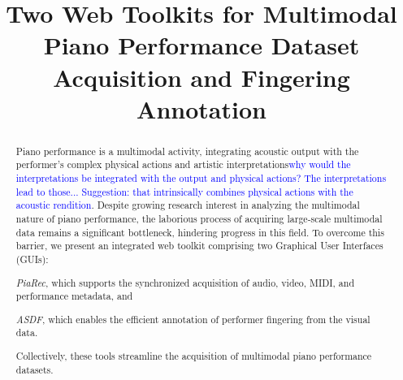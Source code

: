 \documentclass{article}
\title{Two Web Toolkits for Multimodal Piano Performance Dataset Acquisition and Fingering Annotation} %
\newcommand{\alex}[1]{\textcolor{blue}{#1}}%
\begin{document}
\maketitle %

\begin{abstract}


Piano performance is a multimodal activity, integrating acoustic output with the performer's complex physical actions and artistic interpretations\alex{why would the interpretations be integrated with the output and physical actions? The interpretations lead to those... Suggestion: that intrinsically combines physical actions with the acoustic rendition}. Despite growing research interest in analyzing the multimodal nature of piano performance, the laborious process of acquiring large-scale multimodal data remains a significant bottleneck, hindering progress in this field. To overcome this barrier, we present an integrated web toolkit comprising two Graphical User Interfaces (GUIs):
\begin{inparaenum}[(i)]
\item \textit{PiaRec}, which supports the synchronized acquisition of audio, video, MIDI, and performance metadata, and
\item \textit{ASDF}, which enables the efficient annotation of performer fingering from the visual data. 
\end{inparaenum}
Collectively, these tools streamline the acquisition of multimodal piano performance datasets.


\end{abstract}
\end{document}
